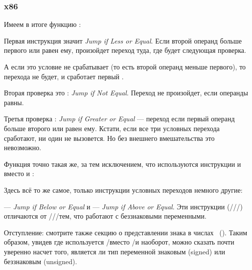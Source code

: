 \subsubsection{x86}


Имеем в итоге функцию :



Первая инструкция \JLE значит \emph{Jump if Less or Equal}. 
Если второй операнд больше первого или равен ему, произойдет переход туда, где будет следующая проверка.

А если это условие не срабатывает (то есть второй операнд меньше первого), то перехода не будет, 
и сработает первый \printf.

Вторая проверка это \JNE: \emph{Jump if Not Equal}.
Переход не произойдет, если операнды равны.

Третья проверка \JGE: \emph{Jump if Greater or Equal} --- переход 
если первый операнд больше второго или равен ему.
Кстати, если все три условных перехода сработают, ни один \printf не вызовется. 
Но без внешнего вмешательства это невозможно.

Функция  точно такая же, за тем исключением, что используются инструкции 
\JBE и \JAE вместо \JLE и \JGE:



Здесь всё то же самое, только инструкции условных переходов немного другие:

\JBE --- \emph{Jump if Below or Equal} и \JAE --- \emph{Jump if Above or Equal}.
Эти инструкции (/\JAE/\JB/\JBE) 
отличаются от \JG/\JGE/\JL/\JLE тем, что работают с беззнаковыми переменными.

Отступление: смотрите также секцию о представлении знака в числах ~().
Таким образом, увидев где используется \JG/\JL вместо /\JB и наоборот, 
можно сказать почти уверенно насчет того, 
является ли тип переменной знаковым (signed) или беззнаковым (unsigned).

